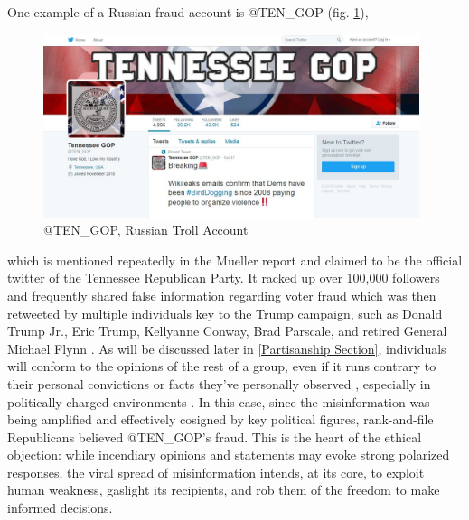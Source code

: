 \documentclass[preprint,review,12pt]{elsarticle}
\begin{document}
One example of a Russian fraud account is @TEN\_GOP (fig. \ref{fig:Russian Troll Account @TEN_GOP}), \begin{figure}[h]
    \centering
    \includegraphics[width=11cm]{Ten_GOP.jpeg}
    \caption{@TEN\_GOP, Russian Troll Account}
    \label{fig:Russian Troll Account @TEN_GOP}
\end{figure} which is mentioned repeatedly in the Mueller report and claimed to be the official twitter of the Tennessee Republican Party. It racked up over 100,000 followers and frequently shared false information regarding voter fraud which was then retweeted by multiple individuals key to the Trump campaign, such as Donald Trump Jr., Eric Trump, Kellyanne Conway, Brad Parscale, and retired General Michael Flynn \cite{mueller2019mueller}. As will be discussed later in \ref{Partisanship Section}, individuals will conform to the opinions of the rest of a group, even if it runs contrary to their personal convictions or facts they've personally observed \cite{asch1956studies}, especially in politically charged environments \cite{bullock2007experiments,housholder2014facebook}. In this case, since the misinformation was being amplified and effectively cosigned by key political figures, rank-and-file Republicans believed @TEN\_GOP's fraud. This is the heart of the ethical objection: while incendiary opinions and statements may evoke strong polarized responses, 
the viral spread of misinformation intends, at its core, to exploit human weakness, gaslight its recipients, and rob them of the freedom to make informed decisions.
\end{document}
